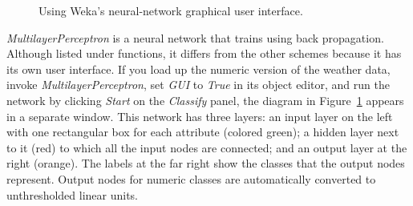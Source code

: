 \begin{figure}[!th]
\centering
{}
\qquad
{}
\caption{\label{fig:mlp_editor}Using Weka's neural-network graphical user interface.}
\end{figure}

\textit{MultilayerPerceptron} is a neural network that trains using
back propagation. Although listed under functions, it differs from the
other schemes because it has its own user interface. If you load up
the numeric version of the weather data, invoke
\textit{MultilayerPerceptron}, set \textit{GUI} to \textit{True} in
its object editor, and run the network by clicking \textit{Start} on
the \textit{Classify} panel, the diagram in
Figure~\ref{fig:mlp_editor} appears in a separate window. This network
has three layers: an input layer on the left with one rectangular box
for each attribute (colored green); a hidden layer next to it (red) to
which all the input nodes are connected; and an output layer at the
right (orange). The labels at the far right show the classes that the
output nodes represent. Output nodes for numeric classes are
automatically converted to unthresholded linear units.

